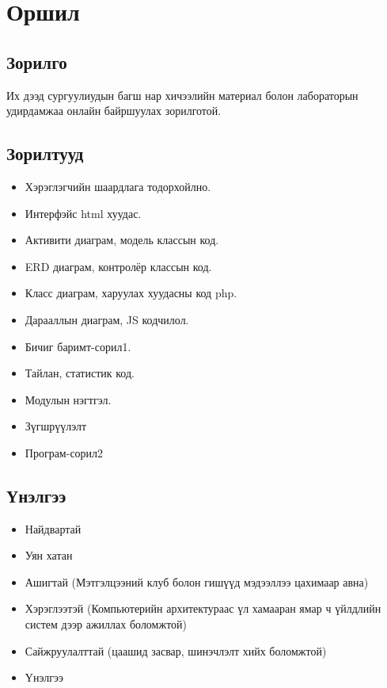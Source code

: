 
\chapter{Оршил} %
\label{Chapter1} %

\newcommand{\keyword}[1]{\textbf{#1}}
\newcommand{\tabhead}[1]{\textbf{#1}}
\newcommand{\code}[1]{\texttt{#1}}
\newcommand{\file}[1]{\texttt{\bfseries#1}}
\newcommand{\option}[1]{\texttt{\itshape#1}}

\section{Зорилго}
Их дээд сургуулиудын багш нар хичээлийн материал болон лабораторын удирдамжаа онлайн байршуулах зорилготой. 

	\section{Зорилтууд}
		\begin{itemize}
			\item Хэрэглэгчийн шаардлага тодорхойлно. 
			\item Интерфэйс html хуудас.
			\item Активити диаграм, модель классын код.
			\item ERD диаграм, контролёр классын код.
			\item Класс диаграм, харуулах хуудасны код php.
			\item Дарааллын диаграм, JS кодчилол.
			\item Бичиг баримт-сорил1.
			\item Тайлан, статистик код.
			\item Модулын нэгтгэл.
			\item Зүгшрүүлэлт
			\item Програм-сорил2
		\end{itemize}
	
	\section{Үнэлгээ}
		\begin{itemize}
			\item Найдвартай
			\item Уян хатан
			\item Ашигтай (Мэтгэлцээний клуб болон гишүүд мэдээллээ цахимаар авна)
			\item Хэрэглээтэй (Компьютерийн архитектураас үл хамааран ямар ч үйлдлийн систем дээр ажиллах боломжтой)
			\item Сайжруулалттай (цаашид засвар, шинэчлэлт хийх боломжтой)
			\item Үнэлгээ 	
		\end{itemize}


